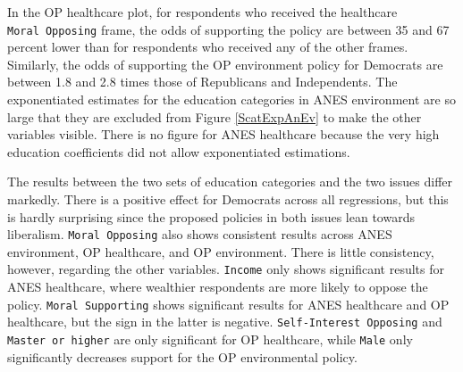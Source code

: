 \documentclass[12pt,econ]{sources/authesis}
\begin{document}
In the OP healthcare plot, for respondents who received the healthcare \texttt{Moral\ Opposing} frame, the odds of supporting the policy are between 35 and 67 percent lower than for respondents who received any of the other frames. Similarly, the odds of supporting the OP environment policy for Democrats are between 1.8 and 2.8 times those of Republicans and Independents. The exponentiated estimates for the education categories in ANES environment are so large that they are excluded from Figure \ref{ScatExpAnEv} to make the other variables visible. There is no figure for ANES healthcare because the very high education coefficients did not allow exponentiated estimations.

The results between the two sets of education categories and the two issues differ markedly. There is a positive effect for Democrats across all regressions, but this is hardly surprising since the proposed policies in both issues lean towards liberalism. \texttt{Moral\ Opposing} also shows consistent results across ANES environment, OP healthcare, and OP environment. There is little consistency, however, regarding the other variables. \texttt{Income} only shows significant results for ANES healthcare, where wealthier respondents are more likely to oppose the policy. \texttt{Moral\ Supporting} shows significant results for ANES healthcare and OP healthcare, but the sign in the latter is negative. \texttt{Self-Interest\ Opposing} and \texttt{Master\ or\ higher} are only significant for OP healthcare, while \texttt{Male} only significantly decreases support for the OP environmental policy.
\end{document}
